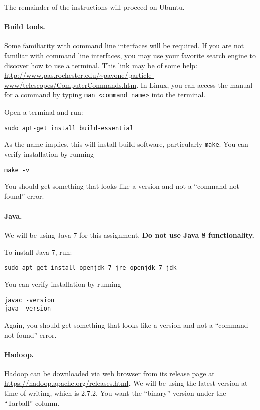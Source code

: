 \documentclass[10pt]{article}
\begin{document}
The remainder of the instructions will proceed on Ubuntu.

\paragraph{Build tools.}

Some familiarity with command line interfaces will be required. If you are not familiar with command line interfaces, you may use your favorite search engine to discover how to use a terminal. This link may be of some help: \url{http://www.pas.rochester.edu/~pavone/particle-www/telescopes/ComputerCommands.htm}. In Linux, you can access the manual for a command by typing \texttt{man <command name>} into the terminal.

Open a terminal and run:

\begin{verbatim}
sudo apt-get install build-essential
\end{verbatim}

As the name implies, this will install build software, particularly \texttt{make}. You can verify installation by running

\begin{verbatim}
make -v
\end{verbatim}

You should get something that looks like a version and not a ``command not found'' error.

\paragraph{Java.}

We will be using Java 7 for this assignment. \textbf{Do not use Java 8 functionality.}

To install Java 7, run:
\begin{verbatim}
sudo apt-get install openjdk-7-jre openjdk-7-jdk
\end{verbatim}
You can verify installation by running
\begin{verbatim}
javac -version
java -version
\end{verbatim}
Again, you should get something that looks like a version and not a ``command not found'' error.

\paragraph{Hadoop.}

Hadoop can be downloaded via web browser from its release page at \url{https://hadoop.apache.org/releases.html}. We will be using the latest version at time of writing, which is 2.7.2. You want the ``binary'' version under the ``Tarball'' column.
\end{document}
